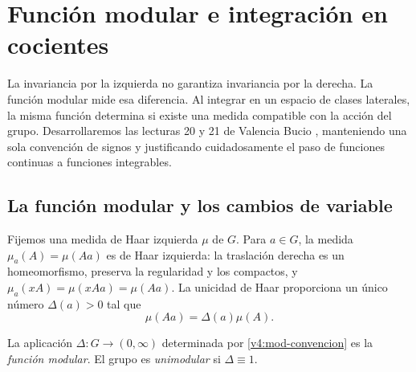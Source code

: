 \chapter{Función modular e integración en cocientes}\label{v4:modular}\label{cap:v4-11}
La invariancia por la izquierda no garantiza invariancia por la derecha. La función modular mide esa diferencia. Al integrar en un espacio de clases laterales, la misma función determina si existe una medida compatible con la acción del grupo. Desarrollaremos las lecturas 20 y 21 de Valencia Bucio \cite{valencia4}, manteniendo una sola convención de signos y justificando cuidadosamente el paso de funciones continuas a funciones integrables.

\section{La función modular y los cambios de variable}\label{lectura:v4-20}
Fijemos una medida de Haar izquierda $\mu$ de $G$. Para $a\in G$, la medida $\mu_a(A)=\mu(Aa)$ es de Haar izquierda: la traslación derecha es un homeomorfismo, preserva la regularidad y los compactos, y $\mu_a(xA)=\mu(xAa)=\mu(Aa)$. La unicidad de Haar proporciona un único número $\Delta(a)>0$ tal que
\begin{equation}\label{v4:mod-convencion}
 \mu(Aa)=\Delta(a)\mu(A).
\end{equation}
\begin{definicion}
La aplicación $\Delta:G\to(0,\infty)$ determinada por \eqref{v4:mod-convencion} es la \emph{función modular}. El grupo es \emph{unimodular} si $\Delta\equiv1$.
\end{definicion}

